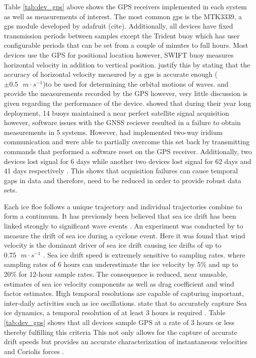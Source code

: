 Table \ref{tab:dev_gps} above shows the GPS receivers implemented in each system as well as measurements of interest. The most common gps is the MTK3339, a gps module developed by adafruit (cite). Additionally, all devices have fixed transmission periods between samples except the Trident buoy which has user configurable periods that can be set from a couple of minutes to full hours. Most devices use the GPS for positional location however, SWIFT buoy measures horizontal velocity in addition to vertical position\cite{thomson2012wave}. \textcite{thomson2012wave} justify this by stating that the accuracy of horizontal velocity measured by a gps is accurate enough ($\pm 0.5 \text{ }m\cdot s^{-1}$)to be used for determining the orbital motions of waves. \textcite{kohout2015device} and \textcite{rabault2019open} provide the measurements recorded by the GPS however, very little discussion is given regarding the performance of the device. \textcite{doble2017robust} showed that during their year long deployment, 14 buoys maintained a near perfect satellite signal acquisition however, software issues with the GNSS reciever resulted in a failure to obtain measurements in 5 systems. However, \textcite{doble2017robust} had implemented two-way iridium communication and were able to partially overcome this set back by transmitting commands that performed a software reset on the GPS receiver. Additionally, two devices lost signal for 6 days while another two devices lost signal for 62 days and 41 days respectively \cite{doble2013wave}. This shows that acquisition failures can cause temporal gaps in data and therefore, need to be reduced in order to provide robust data sets.

Each ice floe follows a unique trajectory \cite{lepparanta2001sea}  and individual trajectories combine to form a continuum. It has previously been believed that sea ice drift has been linked strongly to significant wave events \cite{alberello2019drift}. An experiment was conducted by \textcite{alberello2019drift} to measure the drift of sea ice during a cyclone event. Here it was found that wind velocity is the dominant driver of sea ice drift \cite{alberello2019drift} causing ice drifts of up to $0.75\text{ } m\cdot s^{-1}$ \cite{alberello2019drift}. Sea ice drift speed is extremely sensitive to sampling rates. \cite{alberello2019drift} where sampling rates of 6 hours can underestimate the ice velocity by 5\% \cite{alberello2019drift} and up to 20\% for 12-hour sample rates. The consequence is reduced, near unusable, estimates of sea ice velocity components as well as drag coefficient and wind factor estimates. High temporal resolutions are capable of capturing important, inter-daily activities such as ice oscillations. \textcite{alberello2019drift} state that to accurately capture Sea ice dynamics, a temporal resolution of at least 3 hours is required \cite{alberello2019drift}. Table \ref{tab:dev_gps} shows that all devices sample GPS at a rate of 3 hours or less thereby fulfilling this criteria This not only allows for the capture of accurate drift speeds but provides an accurate characterization of instantaneous velocities and Coriolis forces \cite{alberello2019drift}.
 
